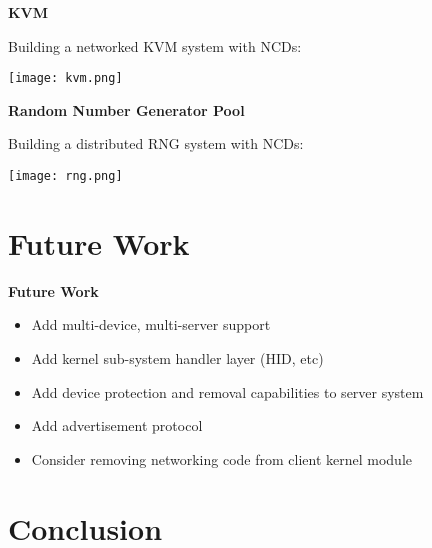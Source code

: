 \documentclass[handout]{beamer}
\begin{document}
\begin{frame}{\bf KVM}

Building a networked KVM system with NCDs:

  \begin{center}
    \texttt{[image: kvm.png]}
  \end{center}

\end{frame}

\begin{frame}{\bf Random Number Generator Pool}

Building a distributed RNG system with NCDs:

  \begin{center}
    \texttt{[image: rng.png]}
  \end{center}

\end{frame}

\section{Future Work}
\begin{frame}{\bf Future Work}

\begin{itemize}
\item<1-> Add multi-device, multi-server support
\item<2-> Add kernel sub-system handler layer (HID, etc)
\item<3-> Add device protection and removal capabilities to server system
\item<4-> Add advertisement protocol
\item<5-> Consider removing networking code from client kernel module
\end{itemize}

\end{frame}

\section{Conclusion}
\end{document}
